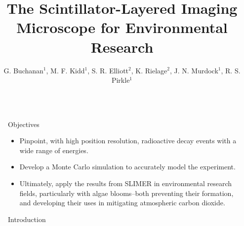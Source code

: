 \documentclass[final]{beamer}
\title{The Scintillator-Layered Imaging Microscope for Environmental Research} %
\author{\texorpdfstring{G. Buchanan$^1$, M. F. Kidd$^1$, S. R. Elliott$^2$, K. Rielage$^2$, J. N. Murdock$^1$, R. S. Pirkle$^1$}{}}%
\institute{$^1$Tennessee Tech University, $^2$Los Alamos National Laboratory} %
\newlength{\sepwid}
\newlength{\onecolwid}
\begin{document}

\setlength{\belowcaptionskip}{2ex} %
\setlength\belowdisplayshortskip{2ex} %

\begin{frame}[t] %

\begin{columns}[t] %

\begin{column}{\sepwid}\end{column} %

\begin{column}{\onecolwid} %


\begin{alertblock}{Objectives}

\begin{itemize}
\item Pinpoint, with high position resolution, radioactive decay events with a wide range of energies.
\item Develop a Monte Carlo simulation to accurately model the experiment.
\item Ultimately, apply the results from SLIMER in environmental research fields, particularly with algae blooms--both preventing their formation, and developing their uses in mitigating atmospheric carbon dioxide.
\end{itemize}

\end{alertblock}


\begin{block}{Introduction}


\end{block}
\end{column}
\end{columns}
\end{frame}
\end{document}
